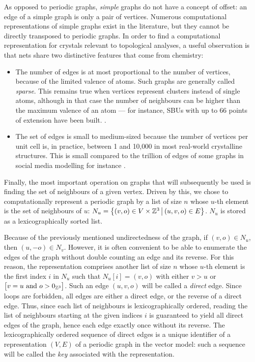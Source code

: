 \documentclass[main.tex]{subfiles}
\begin{document}
As opposed to periodic graphs, \emph{simple} graphs do not have a concept of offset: an edge of a simple graph is only a pair of vertices. Numerous computational representations of simple graphs exist in the literature, but they cannot be directly transposed to periodic graphs. In order to find a computational representation for crystals relevant to topological analyses, a useful observation is that nets share two distinctive features that come from chemistry:
\begin{itemize}[noitemsep]
	\item The number of edges is at most proportional to the number of vertices, because of the limited valence of atoms. Such graphs are generally called \emph{sparse}. This remains true when vertices represent clusters instead of single atoms, although in that case the number of neighbours can be higher than the maximum valence of an atom --- for instance, SBUs with up to 66 points of extension have been built. \autocite{SBUs}.
	\item The set of edges is small to medium-sized because the number of vertices per unit cell is, in practice, between 1 and 10,000 in most real-world crystalline structures. This is small compared to the trillion of edges of some graphs in social media modelling for instance \autocite{facebook}.
\end{itemize}

Finally, the most important operation on graphs that will subsequently be used is finding the set of neighbours of a given vertex. Driven by this, we chose to computationally represent a periodic graph by a list of size $n$ whose $u$-th element is the set of neighbours of $u$: \linebreak$N_u= \left\{(v,o)\in V\times\mathbb{Z}^3\,\middle|\,(u,v,o)\in E\right\}$. $N_u$ is stored as a lexicographically sorted list. %

Because of the previously mentioned undirectedness of the graph, if $(v,o)\in N_u$, then $(u,-o)\in N_v$. However, it is often convenient to be able to enumerate the edges of the graph without double counting an edge and its reverse. For this reason, the representation comprises another list of size $n$ whose $u$-th element is the first index $i$ in $N_u$ such that $N_u[i] = (v,o)$ with either $v>u$ or $\big[ v = u\text{ and }o > 0_{\mathbb{Z}^3} \big]$. Such an edge $(u,v,o)$ will be called a \emph{direct} edge. Since loops are forbidden, all edges are either a direct edge, or the reverse of a direct edge. Thus, since each list of neighbours is lexicographically ordered, reading the list of neighbours starting at the given indices $i$ is guaranteed to yield all direct edges of the graph, hence each edge exactly once without its reverse. The lexicographically ordered sequence of direct edges is a unique identifier of a representation $(V,E)$ of a periodic graph in the vector model: such a sequence will be called the \emph{key} associated with the representation.
\end{document}
